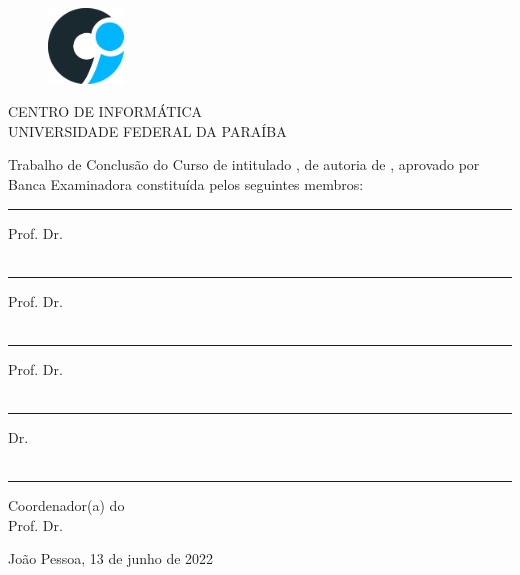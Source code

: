 \newpage
\begin{figure}[H]
\centering
\includegraphics[width=2cm]{img/logo-ci.png}
\end{figure}

\begin{center}
CENTRO DE INFORMÁTICA \\
UNIVERSIDADE FEDERAL DA PARAÍBA
\end{center}

\vspace{1cm}

\noindent Trabalho de Conclusão do Curso de \nomedocurso intitulado \textit{\bf \em \thetitle}, de autoria de \theauthor, aprovado por Banca Examinadora constituída pelos seguintes membros: \\

\vspace{0.5in}

\hrule
\noindent Prof. Dr. \profa\\
\insta\\

\vspace{0.2in}

\hrule
\noindent Prof. Dr. \profb\\
\instb\\

\vspace{0.2in}

\hrule
\noindent Prof. Dr. \profc\\
\instc\\

\vspace{0.2in}

\hrule
\noindent Dr. \profd\\
\instd\\

\vspace{2cm}
\vfill

\hrule
\noindent Coordenador(a) do \departamento\\
Prof. Dr. \coordenador\\

\vfill

\begin{center}
João Pessoa, 13 de junho de 2022%
\end{center}

